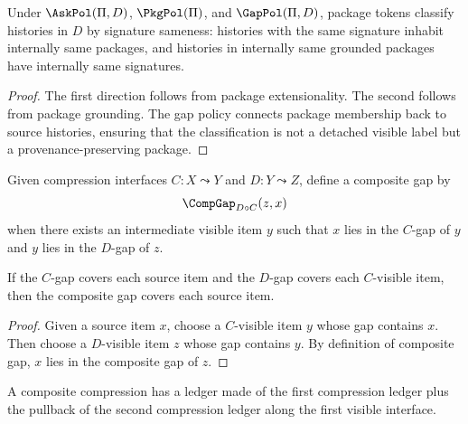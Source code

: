 \begin{theorem}
\label{thm:packages-classify-signatures}
\label{thm:packages-classify-signatures-directional}
Under $\AskPol(\Pi,D)$, $\PkgPol(\Pi)$, and $\GapPol(\Pi,D)$, package tokens classify histories in $D$ by signature sameness: histories with the same signature inhabit internally same packages, and histories in internally same grounded packages have internally same signatures.
\end{theorem}
\begin{proof}
The first direction follows from package extensionality. The second follows from package grounding. The gap policy connects package membership back to source histories, ensuring that the classification is not a detached visible label but a provenance-preserving package.
\end{proof}

\begin{definition}
Given compression interfaces \(C:X\leadsto Y\) and \(D:Y\leadsto Z\), define a composite gap by
$$
\CompGap_{D\circ C}(z,x)
$$
when there exists an intermediate visible item \(y\) such that \(x\) lies in the \(C\)-gap of \(y\) and \(y\) lies in the \(D\)-gap of \(z\).
\end{definition}

\begin{theorem}
\label{thm:composite-gap-coverage-proof-standing}
If the \(C\)-gap covers each source item and the \(D\)-gap covers each \(C\)-visible item, then the composite gap covers each source item.
\end{theorem}
\begin{proof}
Given a source item \(x\), choose a \(C\)-visible item \(y\) whose gap contains \(x\). Then choose a \(D\)-visible item \(z\) whose gap contains \(y\). By definition of composite gap, \(x\) lies in the composite gap of \(z\).
\end{proof}

\begin{corollary}
\label{cor:ledger-composition-principle-proof-standing}
A composite compression has a ledger made of the first compression ledger plus the pullback of the second compression ledger along the first visible interface.
\end{corollary}
